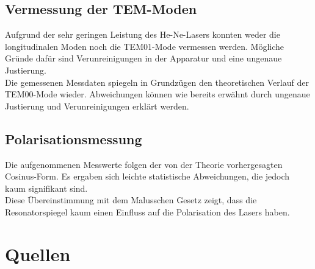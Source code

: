 \documentclass[]{scrartcl}
\begin{document}
\subsection{Vermessung der TEM-Moden}
Aufgrund der sehr geringen Leistung des He-Ne-Lasers konnten weder die longitudinalen Moden noch die TEM01-Mode vermessen werden. Mögliche Gründe dafür sind Verunreinigungen in der Apparatur und eine ungenaue Justierung. \\
Die gemessenen Messdaten spiegeln in Grundzügen den theoretischen Verlauf der TEM00-Mode wieder. Abweichungen können wie bereits erwähnt durch ungenaue Justierung und Verunreinigungen erklärt werden. 

\subsection{Polarisationsmessung}
Die aufgenommenen Messwerte folgen der von der Theorie vorhergesagten Cosinus-Form. Es ergaben sich leichte statistische Abweichungen, die jedoch kaum signifikant sind. \\
Diese Übereinstimmung mit dem Malusschen Gesetz zeigt, dass die Resonatorspiegel kaum einen Einfluss auf die Polarisation des Lasers haben.

\section{Quellen}
\end{document}
